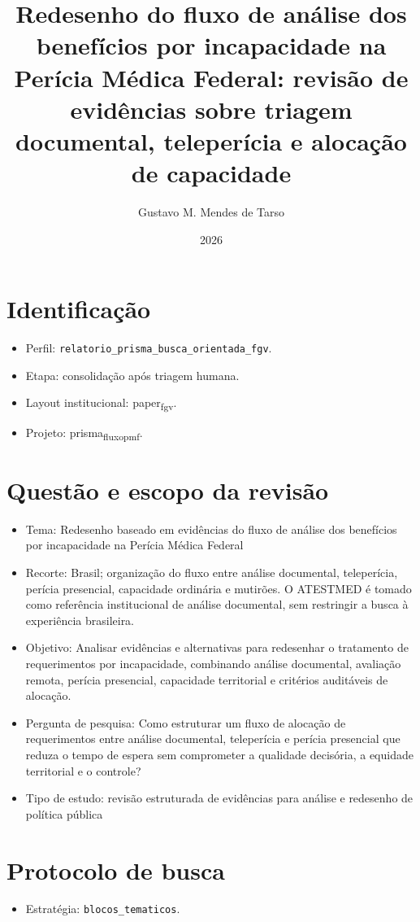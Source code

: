 \documentclass[12pt,a4paper]{article}
\author{Gustavo M. Mendes de Tarso}
\date{2026}
\title{Redesenho do fluxo de análise dos benefícios por incapacidade na Perícia Médica Federal: revisão de evidências sobre triagem documental, teleperícia e alocação de capacidade}
\begin{document}
\maketitle
\tableofcontents


\section{Identificação}
\label{sec:org3a2ab8a}
\begin{itemize}
\item Perfil: \texttt{relatorio\_prisma\_busca\_orientada\_fgv}.
\item Etapa: consolidação após triagem humana.
\item Layout institucional: paper\textsubscript{fgv}.
\item Projeto: prisma\textsubscript{fluxo}\textsubscript{pmf}.
\end{itemize}

\section{Questão e escopo da revisão}
\label{sec:orgac75468}
\begin{itemize}
\item Tema: Redesenho baseado em evidências do fluxo de análise dos benefícios por incapacidade na Perícia Médica Federal
\item Recorte: Brasil; organização do fluxo entre análise documental, teleperícia, perícia presencial, capacidade ordinária e mutirões. O ATESTMED é tomado como referência institucional de análise documental, sem restringir a busca à experiência brasileira.
\item Objetivo: Analisar evidências e alternativas para redesenhar o tratamento de requerimentos por incapacidade, combinando análise documental, avaliação remota, perícia presencial, capacidade territorial e critérios auditáveis de alocação.
\item Pergunta de pesquisa: Como estruturar um fluxo de alocação de requerimentos entre análise documental, teleperícia e perícia presencial que reduza o tempo de espera sem comprometer a qualidade decisória, a equidade territorial e o controle?
\item Tipo de estudo: revisão estruturada de evidências para análise e redesenho de política pública
\end{itemize}

\section{Protocolo de busca}
\label{sec:orgeca513e}
\begin{itemize}
\item Estratégia: \texttt{blocos\_tematicos}.
\end{itemize}
\end{document}
